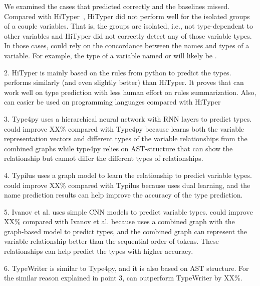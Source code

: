 We examined the cases that {\tool} predicted correctly and the
baselines missed. Compared with HiTyper~\cite{HiTyper-icse22}, HiTyper
did not perform well for the isolated groups of a couple
variables. That is, the groups are isolated, i.e., not type-dependent
to other variables and HiTyper did not correctly detect any of those
variable types. In those cases, {\tool} could rely on the concordance
between the names and types of a variable. For example, the type of a
variable named  or  will likely be .


2. HiTyper is mainly based on the rules from python to predict the types. {\tool} performs similarly (and even slightly better) than HiTyper. It proves that {\tool} can work well on type prediction with less human effort on rules summarization. Also, {\tool} can easier be used on programming languages compared with HiTyper

3. Type4py uses a hierarchical neural network with RNN layers to predict types. {\tool} could improve XX\% compared with Type4py because {\tool} learns both the variable representation vectors and different types of the variable relationships from the combined graphs while type4py relies on AST-structure that can show the relationship but cannot differ the different types of relationships.

4. Typilus uses a graph model to learn the relationship to predict variable types. {\tool} could improve XX\% compared with Typilus because {\tool} uses dual learning, and the name prediction results can help improve the accuracy of the type prediction.

5. Ivanov et al.\cite{ivanov21predicting} uses simple CNN models to predict variable types. {\tool} could improve XX\% compared with Ivanov et al.\cite{ivanov21predicting} because {\tool} uses a combined graph with the graph-based model to predict types, and the combined graph can represent the variable relationship better than the sequential order of tokens. These relationships can help predict the types with higher accuracy.

6. TypeWriter is similar to Type4py, and it is also based on AST structure. For the similar reason explained in point 3, {\tool} can outperform TypeWriter by XX\%.
